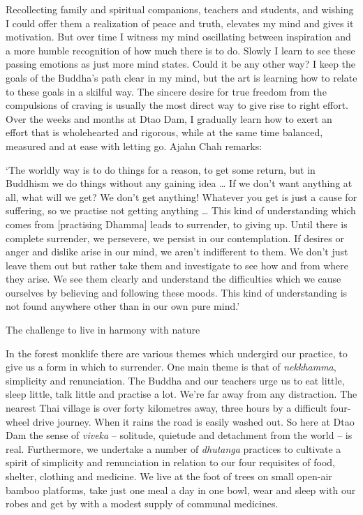 Recollecting family and spiritual companions, teachers and students, and
wishing I could offer them a realization of peace and truth, elevates my
mind and gives it motivation. But over time I witness my mind
oscillating between inspiration and a more humble recognition of how
much there is to do. Slowly I learn to see these passing emotions as
just more mind states. Could it be any other way? I keep the goals of
the Buddha's path clear in my mind, but the art is learning how to
relate to these goals in a skilful way. The sincere desire for true
freedom from the compulsions of craving is usually the most direct way
to give rise to right effort. Over the weeks and months at Dtao Dam, I
gradually learn how to exert an effort that is wholehearted and
rigorous, while at the same time balanced, measured and at ease with
letting go. Ajahn Chah remarks:

`The worldly way is to do things for a reason, to get some return, but
in Buddhism we do things without any gaining idea \ldots{} If we don't
want anything at all, what will we get? We don't get anything! Whatever
you get is just a cause for suffering, so we practise not getting
anything \ldots{} This kind of understanding which comes from
{[}practising Dhamma{]} leads to surrender, to giving up. Until there is
complete surrender, we persevere, we persist in our contemplation. If
desires or anger and dislike arise in our mind, we aren't indifferent to
them. We don't just leave them out but rather take them and investigate
to see how and from where they arise. We see them clearly and understand
the difficulties which we cause ourselves by believing and following
these moods. This kind of understanding is not found anywhere other than
in our own pure mind.'

The challenge to live in harmony with nature

In the forest monklife there are various themes which undergird our
practice, to give us a form in which to surrender. One main theme is
that of \emph{nekkhamma}, simplicity and renunciation. The Buddha and
our teachers urge us to eat little, sleep little, talk little and
practise a lot. We're far away from any distraction. The nearest Thai
village is over forty kilometres away, three hours by a difficult
four-wheel drive journey. When it rains the road is easily washed out.
So here at Dtao Dam the sense of \emph{viveka} -- solitude, quietude
and detachment from the world -- is real. Furthermore, we undertake a
number of \emph{dhutanga} practices to cultivate a spirit of simplicity
and renunciation in relation to our four requisites of food, shelter,
clothing and medicine. We live at the foot of trees on small open-air
bamboo platforms, take just one meal a day in one bowl, wear and sleep
with our robes and get by with a modest supply of communal medicines.

